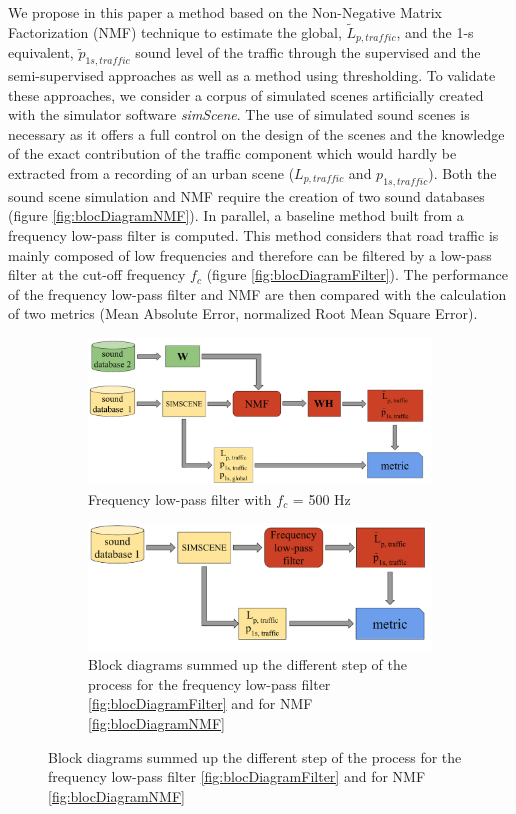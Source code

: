 \documentclass[twocolumn,a4paper,10pt]{article}
\begin{document}
We propose in this paper a method based on the Non-Negative Matrix Factorization (NMF) technique to estimate the global, $\tilde{L}_{p,traffic}$, and the 1-s equivalent, $\tilde{p}_{1s,traffic}$ sound level of the traffic through the supervised and the semi-supervised approaches as well as a method using thresholding. To validate these approaches, we consider a corpus of simulated scenes artificially created with the simulator software \textit{simScene}. The use of simulated sound scenes is necessary as it offers a full control on the design of the scenes and the knowledge of the exact contribution of the traffic component which would hardly be extracted from a recording of an urban scene ($L_{p,traffic}$ and $p_{1s,traffic}$). Both the sound scene simulation and NMF require the creation of two sound databases (figure  \ref{fig:blocDiagramNMF}). In parallel, a baseline method built from a frequency low-pass filter is computed. This method considers that road traffic is mainly composed of low frequencies and therefore can be filtered by a low-pass filter at the cut-off frequency $f_c$ (figure \ref{fig:blocDiagramFilter}). The performance of the frequency low-pass filter and NMF are then compared with the calculation of two metrics (Mean Absolute Error, normalized Root Mean Square Error). 


\begin{figure}
    \centering
    \begin{subfigure}[t]{0.45\textwidth}
        \centering
        \includegraphics[width=.45\linewidth]{../image/bloc_diagram_NMF_EN.pdf}
        \caption{Frequency low-pass filter with $f_c$ = 500 Hz}
        \label{fig:TIR_class_filter}
    \end{subfigure}%
    \hfill
    \begin{subfigure}[t]{0.45\textwidth}
        \centering
        \includegraphics[width=.45\linewidth]{../image/bloc_diagram_filtrage_EN.pdf}
        \caption{Block diagrams summed up the different step of the process for the frequency low-pass filter \ref{fig:blocDiagramFilter} and for NMF \ref{fig:blocDiagramNMF}}
		\label{fig:TIR_class_sup}
    \end{subfigure}
\end{figure}
    
\end{document}
